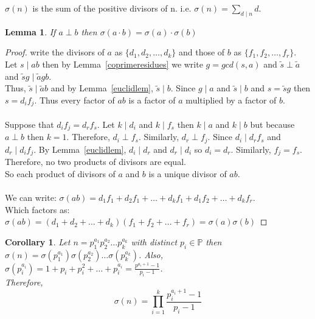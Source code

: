 \documentclass[12pt]{extarticle}
\renewcommand\qedsymbol{$\square$}
\newcommand{\divides}{\mid}
\newcommand{\Primes}{\mathbb{P}}
\newtheorem{lemma}[theorem]{Lemma}
\newtheorem{corollary}[theorem]{Corollary}
\newenvironment{definition}[1][Definition:]{\begin{trivlist}
\item[\hskip \labelsep {\bfseries #1}]}{\end{trivlist}}
\newenvironment{lproof}{\begin{proof} \renewcommand{\qedsymbol}{}}{\end{proof}}
\begin{document}
\begin{definition}
$\sigma (n)$ is the sum of the positive divisors of n. i.e. $\sigma (n) = \sum\limits_{d \divides n} d$.
\end{definition}

\begin{lemma}
If $a \perp b$ then $\sigma (a \cdot b) = \sigma (a) \cdot \sigma (b)$
\end{lemma}

\begin{lproof}
write the divisors of $a$ as $\{d_1, d_2, \dots , d_k\}$ and those of $b$ as $\{f_1, f_2, \dots ,f_r\}$. \\
Let $s \divides ab$ then by Lemma~\ref{coprimeresidues} we write $g = gcd(s, a)$ and $\tilde{s} \perp \tilde{a}$ and $\tilde{s}g \divides \tilde{a}gb$. \\ Thus, $\tilde{s} \divides \tilde{a}b$ and 
by Lemma~\ref{euclidlem}, $\tilde{s} \divides b$. Since $g \divides a$ and $\tilde{s} \divides b$ and $s = \tilde{s}g$ then $s = d_i   f_j$. Thus every factor of $ab$ is a factor of $a$ multiplied by a factor of $b$.  
\\\\
Suppose that $d_i   f_j = d_r   f_s$. Let $k \divides d_i$ and $k \divides f_s$ then $k \divides a$ and $k \divides b$ but because $a \perp b$ then $k = 1$. Therefore, $d_i \perp f_s$. Similarly, $d_r \perp f_j$. Since $d_i \divides d_r   f_s$ and $d_r \divides d_i   f_j$. By Lemma~\ref{euclidlem}, $d_i \divides d_r$ and $d_r \divides d_i$ so $d_i = d_r$. Similarly, $f_j = f_s$. \\ Therefore, no two products of divisors are equal. \\ So each product of divisors of $a$ and $b$ is a unique divisor of $ab$.
\\\\
We can write: $\sigma (ab) = d_1   f_1 + d_2   f_1 + \dots + d_k   f_1 + d_1   f_2 + \dots + d_k   f_r$. \\
Which factors as: $\sigma (ab) = (d_1 + d_2 + \dots + d_k)   (f_1 + f_2 + \dots + f_r) = \sigma (a)   \sigma (b)$
\end{lproof}

\begin{corollary}
Let $n = p_1^{a_1}  p_2^{a_2}  \dots   p_k^{a_k}$ with distinct $p_i \in \Primes$ then \\ $\sigma (n) = \sigma (p_1^{a_1})   \sigma (p_2^{a_2})   \dots   \sigma (p_k^{a_k})$. Also, $\sigma (p_i^{a_i}) = 1 + p_i + p_i^2 + \dots + p_i^{a_i} = \frac{p^{a_i + 1} - 1}{p_i - 1}$. \\
Therefore, \[\sigma (n) = \prod\limits_{i = 1}^{k} \frac{p_i^{a_i + 1} - 1}{p_i - 1} \]
\end{corollary}
\end{document}
